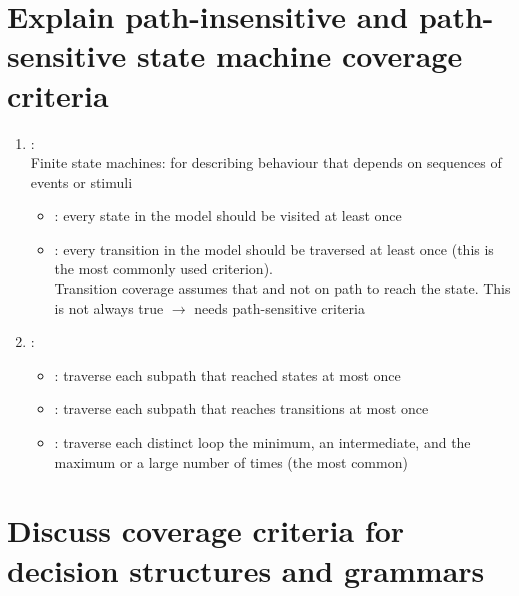 \section{Explain path-insensitive and path-sensitive state machine coverage criteria}

\begin{enumerate}
    \item {} :\\
    Finite state machines: for describing behaviour that depends on sequences of events or stimuli
    \begin{itemize}
        \item {} : every state in the model should be visited at least once
        \item {} : every transition in the model should be traversed at least once (this is the most commonly used criterion).\\
        Transition coverage assumes that  and not on path to reach the state. This is not always true $\rightarrow$ needs path-sensitive criteria
    \end{itemize}
    \item {} :
    \begin{itemize}
        \item {}: traverse each subpath that reached states at most once
        \item {}: traverse each subpath that reaches transitions at most once
        \item {}: traverse each distinct loop the minimum, an intermediate, and the maximum or a large number of times (the most common)
    \end{itemize}
\end{enumerate}

\section{Discuss coverage criteria for decision structures and grammars}

